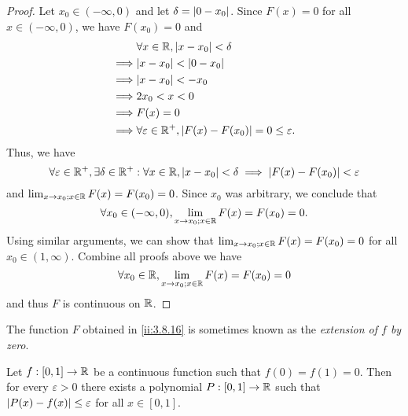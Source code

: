 \begin{proof}
  Let \(x_0 \in (-\infty, 0)\) and let \(\delta = \left\lvert0 - x_0\right\rvert\).
  Since \(F(x) = 0\) for all \(x \in (-\infty, 0)\), we have \(F(x_0) = 0\) and
  \begin{align*}
             & \forall x \in \R, \abs{x - x_0} < \delta                                \\
    \implies & \abs{x - x_0} < \abs{0 - x_0}                                           \\
    \implies & \abs{x - x_0} < -x_0                                                    \\
    \implies & 2x_0 < x < 0                                                            \\
    \implies & F(x) = 0                                                                \\
    \implies & \forall \varepsilon \in \R^+, \abs{F(x) - F(x_0)} = 0 \leq \varepsilon.
  \end{align*}
  Thus, we have
  \[
    \forall \varepsilon \in \mathbb{R}^+, \exists \delta \in \mathbb{R}^+ : \forall x \in \mathbb{R}, \left\lvert x - x_0\right\rvert < \delta \implies \left\lvert F(x) - F(x_0)\right\rvert < \varepsilon
  \]
  and \(\lim_{x \to x_0 ; x \in \mathbb{R}} F(x) = F(x_0) = 0\).
  Since \(x_0\) was arbitrary, we conclude that
  \[
    \forall x_0 \in (-\infty, 0), \lim_{x \to x_0 ; x \in \mathbb{R}} F(x) = F(x_0) = 0.
  \]
  Using similar arguments, we can show that \(\lim_{x \to x_0 ; x \in \mathbb{R}} F(x) = F(x_0) = 0\) for all \(x_0 \in (1, \infty)\).
  Combine all proofs above we have
  \[
    \forall x_0 \in \mathbb{R}, \lim_{x \to x_0 ; x \in \mathbb{R}} F(x) = F(x_0) = 0
  \]
  and thus \(F\) is continuous on \(\mathbb{R}\).
\end{proof}

\begin{rmk}\label{ii:3.8.17}
  The function \(F\) obtained in \cref{ii:3.8.16} is sometimes known as the \emph{extension of \(f\) by zero}.
\end{rmk}

\begin{cor}\label{ii:3.8.18}
  Let \(f : [0, 1] \to \mathbb{R}\) be a continuous function such that \(f(0) = f(1) = 0\).
  Then for every \(\varepsilon > 0\) there exists a polynomial \(P : [0, 1] \to \mathbb{R}\) such that \(\left\lvert P(x) - f(x)\right\rvert \leq \varepsilon\) for all \(x \in [0, 1]\).
\end{cor}

